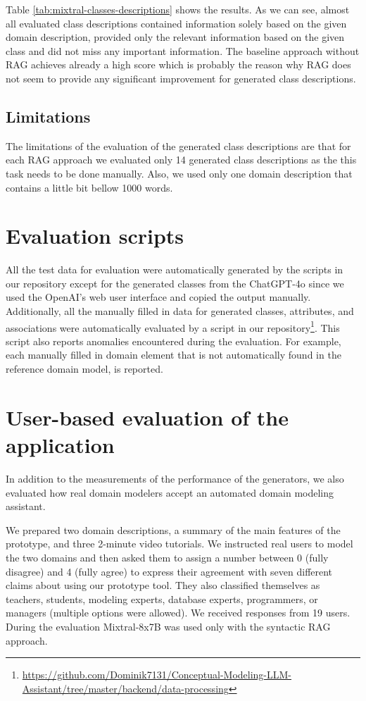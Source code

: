 Table \ref{tab:mixtral-classes-descriptions} shows the results. As we can see, almost all evaluated class descriptions contained information solely based on the given domain description, provided only the relevant information based on the given class and did not miss any important information. The baseline approach without RAG achieves already a high score which is probably the reason why RAG does not seem to provide any significant improvement for generated class descriptions.


\subsection{Limitations}

The limitations of the evaluation of the generated class descriptions are that for each RAG approach we evaluated only 14 generated class descriptions as the this task needs to be done manually. Also, we used only one domain description that contains a little bit bellow 1000 words.


\section{Evaluation scripts}

All the test data for evaluation were automatically generated by the scripts in our repository except for the generated classes from the ChatGPT-4o since we used the OpenAI's web user interface and copied the output manually. Additionally, all the manually filled in data for generated classes, attributes, and associations were automatically evaluated by a script in our repository\footnote{\url{https://github.com/Dominik7131/Conceptual-Modeling-LLM-Assistant/tree/master/backend/data-processing}}. This script also reports anomalies encountered during the evaluation. For example, each manually filled in domain element that is not automatically found in the reference domain model, is reported.


\section{User-based evaluation of the application}

In addition to the measurements of the performance of the generators, we also evaluated how real domain modelers accept an automated domain modeling assistant. 

We prepared two domain descriptions, a summary of the main features of the prototype, and three 2-minute video tutorials. We instructed real users to model the two domains and then asked them to assign a number between 0 (fully disagree) and 4 (fully agree) to express their agreement with seven different claims about using our prototype tool.
They also classified themselves as teachers, students, modeling experts, database experts, programmers, or managers (multiple options were allowed).
We received responses from 19 users. During the evaluation Mixtral-8x7B was used only with the syntactic RAG approach.

